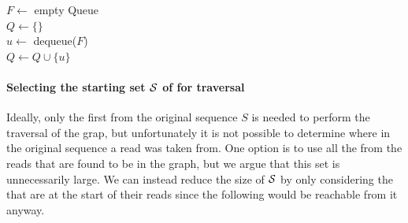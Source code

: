 
\begin{algorithm}
	\caption{$C.\mathit{traverse}(\strsetname{S}, t)$}\label{alg:traversal}
  $F \gets$ empty Queue\\
  $Q \gets \{\}$\\
   {
    $u \gets$ dequeue($F$)\\
    $Q \gets Q \cup \{u\}$\\
  }
\end{algorithm}

\paragraph*{Selecting the starting set $\strsetname{S}$ of  for traversal} Ideally, only the first \kmer from the original sequence $S$ is needed to perform the traversal of the grap, but unfortunately it is not possible to determine where in the original sequence a read was taken from. One option is to use all the  from the reads that are found to be in the graph, but we argue that this set is unnecessarily large. We can instead reduce the size of $\strsetname{S}$ by only considering the  that are at the start of their reads since the following \kmers would be reachable from it anyway.

